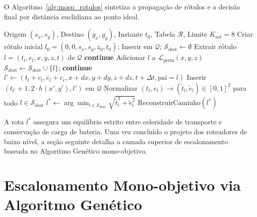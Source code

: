 O Algoritmo~\ref{alg:mosp_rotulos} sintetiza a propagação de rótulos e a decisão final por distância euclidiana ao ponto ideal.

\begin{algorithm}[htbp]
\caption{Propagação de Rótulos e Seleção por Ponto Ideal no MOSP 4D}\label{alg:mosp_rotulos}
\begin{algorithmic}[1]
\REQUIRE Origem $(s_x, s_y)$, Destino $(g_x, g_y)$, Instante $t_0$, Tabela $\mathcal{R}$, Limite $K_{\text{rot}}=8$
\STATE Criar rótulo inicial $l_0 = (0, 0, s_x, s_y, z_0, t_0)$; Inserir em $\mathcal{Q}$; $\mathcal{S}_{\text{dest}} \leftarrow \emptyset$
    \STATE Extrair rótulo $l = (t_l, e_l, x, y, z, t)$ de $\mathcal{Q}$
     \textbf{continue} \ENDIF
    \STATE Adicionar $l$ a $\mathcal{L}_{\text{perm}}(x, y, z)$
     $\mathcal{S}_{\text{dest}} \leftarrow \mathcal{S}_{\text{dest}} \cup \{l\}$; \textbf{continue} \ENDIF
        \STATE $l' \leftarrow (t_l + c_t, e_l + c_e, x+dx, y+dy, z+dz, t+\Delta t, \text{pai}=l)$
            \STATE Inserir $(t_{l'} + 1{,}2 \cdot h(x', y'), l')$ em $\mathcal{Q}$
        \ENDIF
    \ENDFOR
\ENDWHILE
\STATE Normalizar $(t_l, e_l) \to (\tilde{t}_l, \tilde{e}_l) \in [0, 1]^2$ para todo $l \in \mathcal{S}_{\text{dest}}$
\STATE $l^* \leftarrow \arg\min_{l \in \mathcal{S}_{\text{dest}}} \sqrt{\tilde{t}_l^2 + \tilde{e}_l^2}$ 
\RETURN $\text{ReconstruirCaminho}(l^*)$
\end{algorithmic}
\end{algorithm}

A rota $l^*$ assegura um equilíbrio estrito entre celeridade de transporte e conservação de carga de bateria. Uma vez concluído o projeto dos roteadores de baixo nível, a seção seguinte detalha a camada superior de escalonamento baseada no Algoritmo Genético mono-objetivo.

\section{Escalonamento Mono-objetivo via Algoritmo Genético}\label{sec:dev_ga}

